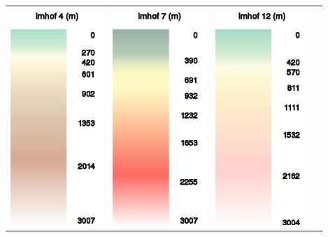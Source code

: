 \documentclass[a4paper,12pt]{refrep}
\begin{document}
\begin{maxipage}
\begin{longtable}{c c c c}
\includegraphics[angle=0,width=3.5cm,keepaspectratio='true']{figures/ramp-terrain-imhof4.png}&
\includegraphics[angle=0,width=3.5cm,keepaspectratio='true']{figures/ramp-terrain-imhof7.png}&
\includegraphics[angle=0,width=3.5cm,keepaspectratio='true']{figures/ramp-terrain-imhof12.png}&

\end{longtable}
\end{maxipage}
\end{document}

